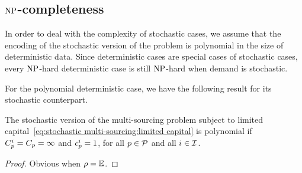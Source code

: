\subsection{$\operatorname{NP}$-completeness}


In order to deal with the complexity of stochastic cases, we assume that the encoding of the stochastic version of the problem is polynomial in the size of deterministic data. Since deterministic cases are special cases of stochastic cases, every $\operatorname{NP}$-hard deterministic case is still $\operatorname{NP}$-hard when demand is stochastic.

For the polynomial deterministic case, we have the following result for its stochastic counterpart.

\begin{prop}
The stochastic version of the multi-sourcing problem subject to limited capital~\eqref{eq:stochastic multi-sourcing:limited capital} is polynomial if $C_p^i=C_p=\infty$ and $c_p^i=1$, for all $p\in\mathcal{P}$ and all $i\in\mathcal{I}$.
\end{prop}

\begin{proof}
Obvious when $\rho=\operatorname{\mathbb{E}}$.


\tbc
\end{proof}



